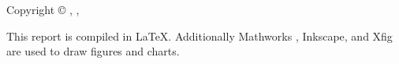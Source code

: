 \thispagestyle{empty}
{\small
\strut\vfill %
\noindent Copyright \copyright{} \projectGroup{}, \projectFaculty{} \projectSemester{}, \AAU{} \the\year\par
\vspace{0.2cm}
\noindent This report is compiled in \LaTeX. Additionally Mathworks \matlab, Inkscape, and Xfig are used to draw figures and charts.
}
\clearpage
